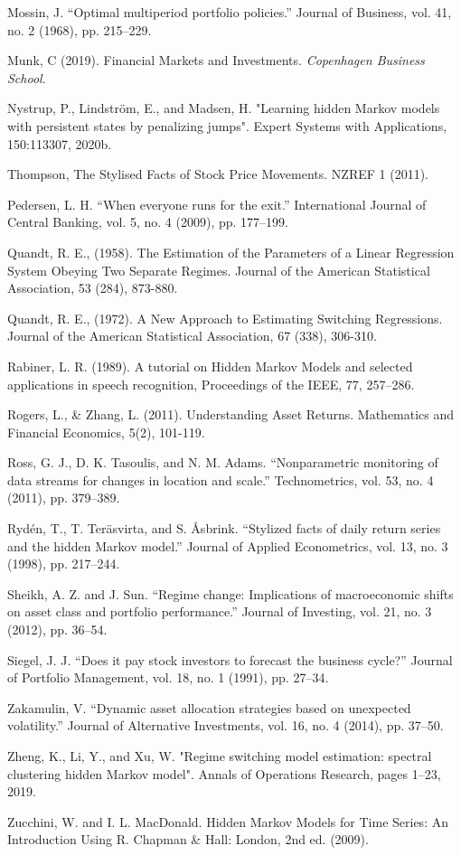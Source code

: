Mossin, J. “Optimal multiperiod portfolio policies.” Journal of Business, vol. 41,
no. 2 (1968), pp. 215–229.

Munk, C (2019). Financial Markets and Investments. \textit{Copenhagen Business School}.

Nystrup, P., Lindström, E., and Madsen, H. "Learning hidden Markov models with persistent states by penalizing jumps". Expert Systems with Applications, 150:113307, 2020b.

Thompson, The Stylised Facts of Stock Price Movements. NZREF 1 (2011).

Pedersen, L. H. “When everyone runs for the exit.” International Journal of Central Banking, vol. 5, no. 4 (2009), pp. 177–199.

Quandt, R. E., (1958). The Estimation of the Parameters of a Linear Regression System Obeying Two Separate Regimes. Journal of the American Statistical Association, 53 (284), 873-880.

Quandt, R. E., (1972). A New Approach to Estimating Switching Regressions. Journal of the American
Statistical Association, 67 (338), 306-310.

Rabiner, L. R. (1989). A tutorial on Hidden Markov Models and selected applications in speech recognition, Proceedings of the IEEE, 77, 257–286.

Rogers, L., \& Zhang, L. (2011). Understanding Asset Returns. Mathematics and Financial Economics,
5(2), 101-119.

Ross, G. J., D. K. Tasoulis, and N. M. Adams. “Nonparametric monitoring of data streams for changes in location and scale.” Technometrics, vol. 53, no. 4 (2011), pp. 379–389.

Rydén, T., T. Teräsvirta, and S. Åsbrink. “Stylized facts of daily return series and the hidden Markov model.” Journal of Applied Econometrics, vol. 13, no. 3 (1998), pp. 217–244.

Sheikh, A. Z. and J. Sun. “Regime change: Implications of macroeconomic shifts on asset class and portfolio performance.” Journal of Investing, vol. 21, no. 3 (2012), pp. 36–54.

Siegel, J. J. “Does it pay stock investors to forecast the business cycle?” Journal of Portfolio Management, vol. 18, no. 1 (1991), pp. 27–34.

Zakamulin, V. “Dynamic asset allocation strategies based on unexpected volatility.” Journal of Alternative Investments, vol. 16, no. 4 (2014), pp. 37–50.

Zheng, K., Li, Y., and Xu, W. "Regime switching model estimation: spectral clustering hidden Markov model". Annals of Operations Research, pages 1–23, 2019.

Zucchini, W. and I. L. MacDonald. Hidden Markov Models for Time Series: An Introduction Using R. Chapman \& Hall: London, 2nd ed. (2009).








